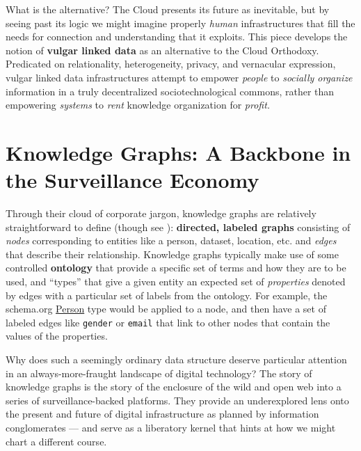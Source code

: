 What is the alternative? The Cloud presents its future as inevitable,
but by seeing past its logic we might imagine properly \emph{human}
infrastructures that fill the needs for connection and understanding
that it exploits. This piece develops the notion of \textbf{vulgar
linked data} as an alternative to the Cloud Orthodoxy. Predicated on
relationality, heterogeneity, privacy, and vernacular expression, vulgar
linked data infrastructures attempt to empower \emph{people} to
\emph{socially organize} information in a truly decentralized
sociotechnological commons, rather than empowering \emph{systems} to
\emph{rent} knowledge organization for \emph{profit.}

\hypertarget{knowledge-graphs-a-backbone-in-the-surveillance-economy}{%
\section{Knowledge Graphs: A Backbone in the Surveillance
Economy}\label{knowledge-graphs-a-backbone-in-the-surveillance-economy}}

Through their cloud of corporate jargon, knowledge graphs are relatively
straightforward to define \cite{chaudhriKnowledgeGraphsIntroduction2022, hitzlerReviewSemanticWeb2021, yanRetrospectiveKnowledgeGraphs2018, bergmanCommonSenseView2019} 
(though see \cite{ehrlingerDefinitionKnowledgeGraphs2016} ):
\textbf{directed, labeled graphs} consisting of \emph{nodes}
corresponding to entities like a person, dataset, location, etc. and
\emph{edges} that describe their relationship. Knowledge
graphs typically make use of some controlled \textbf{ontology} that
provide a specific set of terms and how they are to be used, and
``types'' that give a given entity an expected set of \emph{properties}
denoted by edges with a particular set of labels from the ontology. For
example, the schema.org \href{https://schema.org/Person}{Person} type
would be applied to a node, and then have a set of labeled edges like
\texttt{gender} or \texttt{email} that link to other nodes that contain
the values of the properties.

Why does such a seemingly ordinary data structure deserve particular
attention in an always-more-fraught landscape of digital technology? The
story of knowledge graphs is the story of the enclosure of the wild and
open web into a series of surveillance-backed platforms. They provide an
underexplored lens onto the present and future of digital infrastructure
as planned by information conglomerates --- and serve as a liberatory
kernel that hints at how we might chart a different course.

